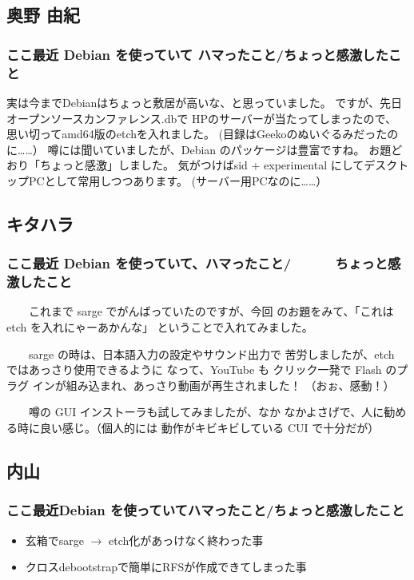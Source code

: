 \documentclass[mingoth,a4paper]{jsarticle}
\begin{document}
\subsection{奥野 由紀}

\subsubsection{ここ最近 Debian を使っていて ハマったこと/ちょっと感激したこと}

実は今までDebianはちょっと敷居が高いな、と思っていました。
ですが、先日オープンソースカンファレンス.dbで
HPのサーバーが当たってしまったので、
思い切ってamd64版のetchを入れました。
(目録はGeekoのぬいぐるみだったのに……）
噂には聞いていましたが、Debian のパッケージは豊富ですね。
お題どおり「ちょっと感激」しました。
気がつけばsid + experimental にしてデスクトップPCとして常用しつつあります。
(サーバー用PCなのに……）

\subsection{キタハラ}

\subsubsection{ここ最近 Debian を使っていて、ハマったこと/
　　　ちょっと感激したこと}

　　これまで sarge でがんばっていたのですが、今回
のお題をみて、「これは etch を入れにゃーあかんな」
ということで入れてみました。

　　sarge の時は、日本語入力の設定やサウンド出力で
苦労しましたが、etch ではあっさり使用できるように
なって、YouTube も クリック一発で Flash のプラグ
インが組み込まれ、あっさり動画が再生されました！
（おぉ、感動！）

　　噂の GUI インストーラも試してみましたが、なか
なかよさげで、人に勧める時に良い感じ。（個人的には
動作がキビキビしている CUI で十分だが）

\subsection{内山}

\subsubsection{ここ最近Debian を使っていてハマったこと/ちょっと感激したこと}

\begin{itemize}
 \item 玄箱でsarge $\rightarrow$ etch化があっけなく終わった事
 \item クロスdebootstrapで簡単にRFSが作成できてしまった事
\end{itemize}
\end{document}
